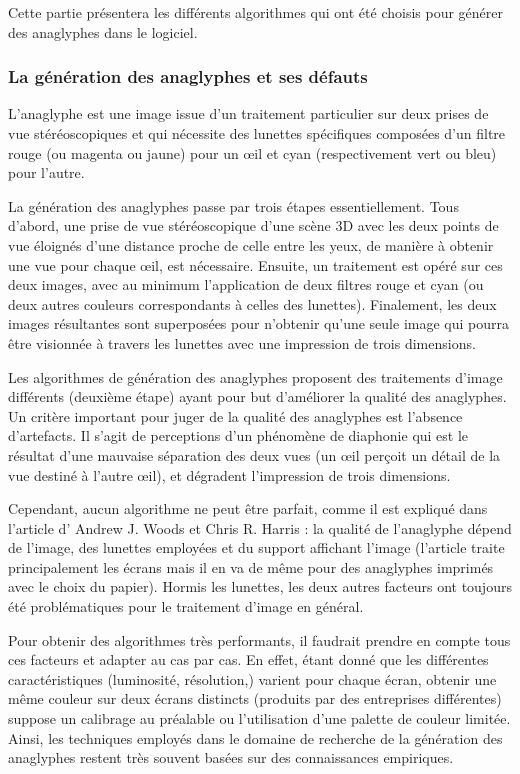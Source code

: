 Cette partie présentera les différents algorithmes qui ont été choisis pour générer des anaglyphes dans le logiciel.

\subsubsection{La génération des anaglyphes et ses défauts}
	L'anaglyphe est une image issue d'un traitement particulier sur deux prises de vue stéréoscopiques et qui nécessite des lunettes spécifiques composées d'un filtre rouge (ou magenta ou jaune) pour un \oe il et cyan (respectivement vert ou bleu) pour l'autre. 
	
	La génération des anaglyphes passe par trois étapes essentiellement. Tous d'abord, une prise de vue stéréoscopique d'une scène 3D avec les deux points de vue éloignés d'une distance proche de celle entre les yeux, de manière à obtenir une vue pour chaque \oe il, est nécessaire. Ensuite, un traitement est opéré sur ces deux images, avec au minimum l'application de deux filtres rouge et cyan (ou deux autres couleurs correspondants à celles des lunettes). Finalement, les deux images résultantes sont superposées pour n'obtenir qu'une seule image qui pourra être visionnée à travers les lunettes avec une impression de trois dimensions.
	
	Les algorithmes de génération des anaglyphes proposent des traitements d'image différents (deuxième étape) ayant pour but d'améliorer la qualité des anaglyphes. Un critère important pour juger de la qualité des anaglyphes est l'absence d'artefacts. Il s'agit de perceptions d'un phénomène de diaphonie qui est le résultat d'une mauvaise séparation des deux vues (un \oe il perçoit un détail de la vue destiné à l'autre \oe il), et dégradent l'impression de trois dimensions. %

	Cependant, aucun algorithme ne peut être parfait, comme il est expliqué dans l'article d' Andrew J. Woods et Chris R. Harris \cite{anaglypheDefaut}  : la qualité de l'anaglyphe dépend de l'image, des lunettes employées et du support affichant l'image (l'article traite principalement les écrans mais il en va de même pour des anaglyphes imprimés avec le choix du papier). Hormis les lunettes, les deux autres facteurs ont toujours été problématiques pour le traitement d'image en général.  
	
	Pour obtenir des algorithmes très performants, il faudrait prendre en compte tous ces facteurs et adapter au cas par cas. En effet, étant donné que les différentes caractéristiques (luminosité, résolution,) varient pour chaque écran, obtenir une même couleur sur deux écrans distincts (produits par des entreprises différentes) suppose un calibrage au préalable ou l'utilisation d'une palette de couleur limitée. Ainsi, les techniques employés dans le domaine de recherche de la génération des anaglyphes restent très souvent basées sur des connaissances empiriques.
		
